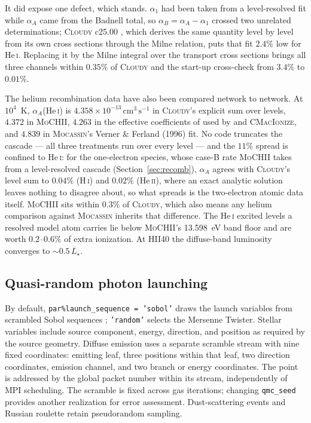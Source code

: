 \documentclass[twocolumn,linenumbers]{aastex702}
\newcommand{\code}[1]{\texttt{#1}}
\newcommand{\MoCHII}{\textsc{MoCHII}}
\newcommand{\HI}{H\,\textsc{i}}
\newcommand{\HeI}{He\,\textsc{i}}
\newcommand{\HeII}{He\,\textsc{ii}}
\newcommand{\cmc}{\mathrm{cm^{3}\,s^{-1}}}
\begin{document}
It did expose one defect, which stands.  $\alpha_1$ had been taken from a
level-resolved fit \citep{mao2016} while $\alpha_A$ came from the Badnell
total, so $\alpha_B = \alpha_A - \alpha_1$ crossed two unrelated
determinations; \textsc{Cloudy} c25.00 \citep{cloudy2025}, which derives the
same quantity level by level from its own cross sections through the Milne
relation, puts that fit $2.4\%$ low for \HeI.  Replacing it by the Milne
integral over the transport cross sections brings all three channels within
$0.35\%$ of \textsc{Cloudy} and the start-up cross-check from $3.4\%$ to
$0.01\%$.

The helium recombination data have also been compared network to network.
At $10^{4}$~K,
$\alpha_A$(\HeI) is $4.358 \times 10^{-13}\,\cmc$ in \textsc{Cloudy}'s
explicit sum over levels, $4.372$ in \MoCHII, $4.263$ in the effective
coefficients of \citet{benjamin1999} used by \citet{wood2004} and
\textsc{CMacIonize}, and $4.839$ in \textsc{Mocassin}'s Verner \& Ferland
(1996) fit.  No code truncates the cascade --- all three treatments run over every
level --- and the $11\%$ spread is confined to \HeI: for the one-electron
species, whose case-B rate \MoCHII{} takes from a level-resolved cascade
(Section~\ref{sec:recomb}), $\alpha_A$ agrees with \textsc{Cloudy}'s level
sum to $0.04\%$ (\HI) and $0.02\%$ (\HeII), where an exact analytic solution
leaves nothing to disagree about, so what spreads is the two-electron atomic
data itself.  \MoCHII{} sits within $0.3\%$ of \textsc{Cloudy}, which also
means any helium comparison against \textsc{Mocassin} inherits that
difference.  The \HeI{} excited levels a resolved model atom carries lie
below \MoCHII's 13.598~eV band floor and are worth $0.2$--$0.6\%$ of extra
ionization.  At HII40 the diffuse-band luminosity converges to
$\sim$$0.5\,L_\star$.

\subsection{Quasi-random photon launching}
\label{sec:qmc}

By default, \code{par\%launch\_sequence = 'sobol'} draws the launch
variables from scrambled Sobol sequences \citep{joekuo2008,burley2020};
\code{'random'} selects the Mersenne Twister. Stellar variables include
source component, energy, direction, and position as required by the source
geometry. Diffuse emission uses a separate scramble stream with nine fixed
coordinates: emitting leaf, three positions within that leaf, two direction
coordinates, emission channel, and two branch or energy coordinates.
The point is addressed by the global packet number within its stream,
independently of MPI scheduling. The scramble is fixed across gas iterations;
changing \code{qmc\_seed} provides another realization for error assessment.
Dust-scattering events and Russian roulette retain pseudorandom sampling.
\end{document}
